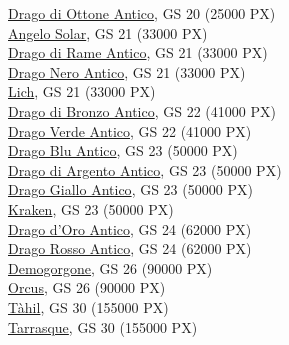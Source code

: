 \begin{multicols}{3}
{\hyperlink{Drago di Ottone Antico}{Drago di Ottone Antico}, GS 20 (25000 PX)\\
\hyperlink{Angelo Solar}{Angelo Solar}, GS 21 (33000 PX)\\
\hyperlink{Drago di Rame Antico}{Drago di Rame Antico}, GS 21 (33000 PX)\\
\hyperlink{Drago Nero Antico}{Drago Nero Antico}, GS 21 (33000 PX)\\
\hyperlink{Lich}{Lich}, GS 21 (33000 PX)\\
\hyperlink{Drago di Bronzo Antico}{Drago di Bronzo Antico}, GS 22 (41000 PX)\\
\hyperlink{Drago Verde Antico}{Drago Verde Antico}, GS 22 (41000 PX)\\
\hyperlink{Drago Blu Antico}{Drago Blu Antico}, GS 23 (50000 PX)\\
\hyperlink{Drago di Argento Antico}{Drago di Argento Antico}, GS 23 (50000 PX)\\
\hyperlink{Drago Giallo Antico}{Drago Giallo Antico}, GS 23 (50000 PX)\\
\hyperlink{Kraken}{Kraken}, GS 23 (50000 PX)\\
\hyperlink{Drago d'Oro Antico}{Drago d'Oro Antico}, GS 24 (62000 PX)\\
\hyperlink{Drago Rosso Antico}{Drago Rosso Antico}, GS 24 (62000 PX)\\
\hyperlink{Demogorgone}{Demogorgone}, GS 26 (90000 PX)\\
\hyperlink{Orcus}{Orcus}, GS 26 (90000 PX)\\
\hyperlink{Tàhil}{Tàhil}, GS 30 (155000 PX)\\
\hyperlink{Tarrasque}{Tarrasque}, GS 30 (155000 PX)\\

}

\end{multicols}

\pagebreak

